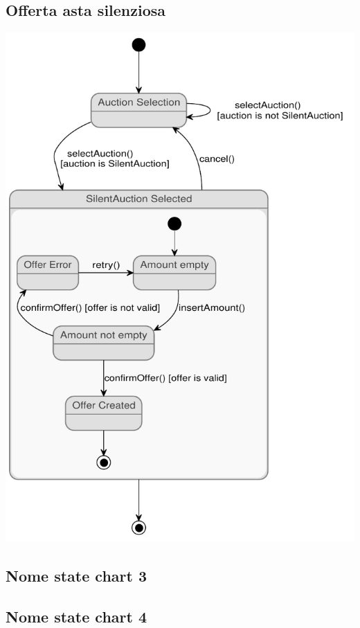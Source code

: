 \subsection{Offerta asta silenziosa}
\begin{center}
\includegraphics[width=.7\textwidth]{assets/state_charts/offerta_asta_silenziosa.pdf}
\end{center}
\newpage

\subsection{Nome state chart 3}
\subsection{Nome state chart 4}
